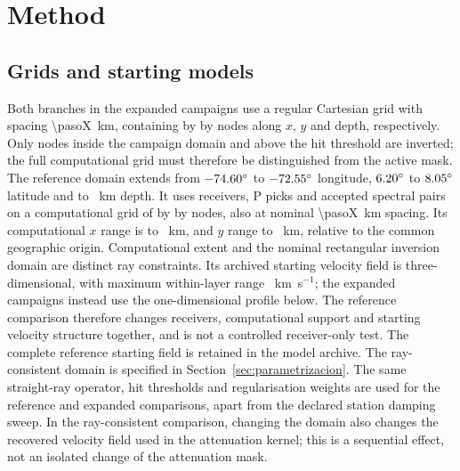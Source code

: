 \documentclass[review,authoryear,longtitle]{elsarticle}
\begin{document}
\section{Method}

\subsection{Grids and starting models}

Both branches in the expanded campaigns use a regular Cartesian grid with spacing
\SI{\pasoX}{\kilo\metre}, containing \nodosX{} by \nodosY{} by
\nodosZ{} nodes along $x$, $y$ and depth, respectively. Only nodes inside
the campaign domain and above the hit threshold are inverted; the full
computational grid must therefore be distinguished from the active mask.
The reference domain extends from $-74.60^{\circ}$ to
$-72.55^{\circ}$ longitude, $6.20^{\circ}$ to
$8.05^{\circ}$ latitude and to \profMaxPrevia~km depth.
It uses \estPrevia{} receivers, \picksPrevia{} P picks and
\qObsPrevia{} accepted spectral pairs on a computational grid of
\nodosReferenciaX{} by \nodosReferenciaY{} by \nodosReferenciaZ{} nodes,
also at nominal \SI{\pasoX}{\kilo\metre} spacing. Its computational
$x$ range is \rejillaReferenciaXMin{} to \rejillaReferenciaXMax~km,
and $y$ range \rejillaReferenciaYMin{} to \rejillaReferenciaYMax~km,
relative to the common geographic origin. Computational extent and the
nominal rectangular inversion domain are distinct ray constraints.
Its archived starting velocity field is three-dimensional, with maximum
within-layer range \rangoLateralVpReferencia~km~s$^{-1}$; the expanded
campaigns instead use the one-dimensional profile below. The reference
comparison therefore changes receivers, computational support and starting
velocity structure together, and is not a controlled receiver-only test.
The complete reference starting field is retained in the model archive.
The ray-consistent domain is
specified in Section~\ref{sec:parametrizacion}. The same straight-ray
operator, hit thresholds and regularisation weights are used for the
reference and expanded comparisons, apart from the declared station
damping sweep. In the ray-consistent comparison, changing the domain
also changes the recovered velocity field used in the attenuation
kernel; this is a sequential effect, not an isolated change of the
attenuation mask.
\end{document}
